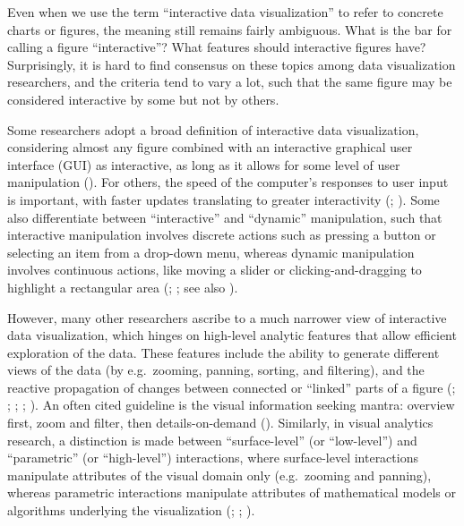\documentclass[
]{book}
\theoremstyle{definition}
\theoremstyle{definition}
\theoremstyle{definition}
\theoremstyle{definition}
\theoremstyle{remark}
\begin{document}
Even when we use the term ``interactive data visualization'' to refer to concrete charts or figures, the meaning still remains fairly ambiguous. What is the bar for calling a figure ``interactive''? What features should interactive figures have? Surprisingly, it is hard to find consensus on these topics among data visualization researchers, and the criteria tend to vary a lot, such that the same figure may be considered interactive by some but not by others.

Some researchers adopt a broad definition of interactive data visualization, considering almost any figure combined with an interactive graphical user interface (GUI) as interactive, as long as it allows for some level of user manipulation (). For others, the speed of the computer's responses to user input is important, with faster updates translating to greater interactivity (; ). Some also differentiate between ``interactive'' and ``dynamic'' manipulation, such that interactive manipulation involves discrete actions such as pressing a button or selecting an item from a drop-down menu, whereas dynamic manipulation involves continuous actions, like moving a slider or clicking-and-dragging to highlight a rectangular area (; ; see also ).

However, many other researchers ascribe to a much narrower view of interactive data visualization, which hinges on high-level analytic features that allow efficient exploration of the data. These features include the ability to generate different views of the data (by e.g.~zooming, panning, sorting, and filtering), and the reactive propagation of changes between connected or ``linked'' parts of a figure (; ; ; ; ). An often cited guideline is the visual information seeking mantra: overview first, zoom and filter, then details-on-demand (). Similarly, in visual analytics research, a distinction is made between ``surface-level'' (or ``low-level'') and ``parametric'' (or ``high-level'') interactions, where surface-level interactions manipulate attributes of the visual domain only (e.g.~zooming and panning), whereas parametric interactions manipulate attributes of mathematical models or algorithms underlying the visualization (; ; ).
\end{document}
